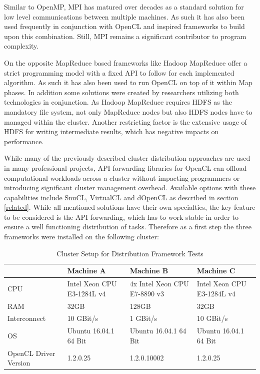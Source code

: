 Similar to OpenMP, MPI has matured over decades as a standard solution for low level communications between multiple machines. As such it has also been used frequently in conjunction with OpenCL and inspired frameworks to build upon this combination. Still, MPI remains a significant contributor to program complexity.

On the opposite MapReduce based frameworks like Hadoop MapReduce offer a strict programming model with a fixed API to follow for each implemented algorithm. As such it has also been used to run OpenCL on top of it within Map phases. In addition some solutions were created by researchers utilizing both technologies in conjunction. As Hadoop MapReduce requires HDFS as the mandatory file system, not only MapReduce nodes but also HDFS nodes have to managed within the cluster. Another restricting factor is the extensive usage of HDFS for writing intermediate results, which has negative impacts on performance.

While many of the previously described cluster distribution approaches are used in many professional projects, API forwarding libraries for OpenCL can offload computational workloads across a cluster without impacting programmers or introducing significant cluster management overhead. Available options with these capabilities include SnuCL, VirtualCL and dOpenCL as described in section \ref{related}. While all mentioned solutions have their own specialties, the key feature to be considered is the API forwarding, which has to work stable in order to ensure a well functioning distribution of tasks. Therefore as a first step the three frameworks were installed on the following cluster:

\begin{table}[htb]
  \centering
    \begin{adjustbox}{width=1\textwidth}
    \small
    \begin{tabular}{l | l | l | l}
    ~                     & Machine A                   & Machine B                  	& Machine C                  \\
    \hline
    CPU                   & Intel Xeon CPU E3-1284L v4 	& 4x Intel Xeon CPU E7-8890 v3 	& Intel Xeon CPU E3-1284L v4 \\
    RAM                   & 32GB                        & 128GB                       	& 32GB                       \\
    Interconnect          & 10 GBit/s                   & 1 GBit/s                  	& 10 GBit/s                  \\
    OS                    & Ubuntu 16.04.1 64 Bit       & Ubuntu 16.04.1 64 Bit      	& Ubuntu 16.04.1 64 Bit      \\
    OpenCL Driver Version & 1.2.0.25          			& 1.2.0.10002                   & 1.2.0.25                   \\
    \end{tabular}
    \end{adjustbox}

    \caption{Cluster Setup for Distribution Framework Tests}
    \label{table:cluster_setup_1}
\end{table}

